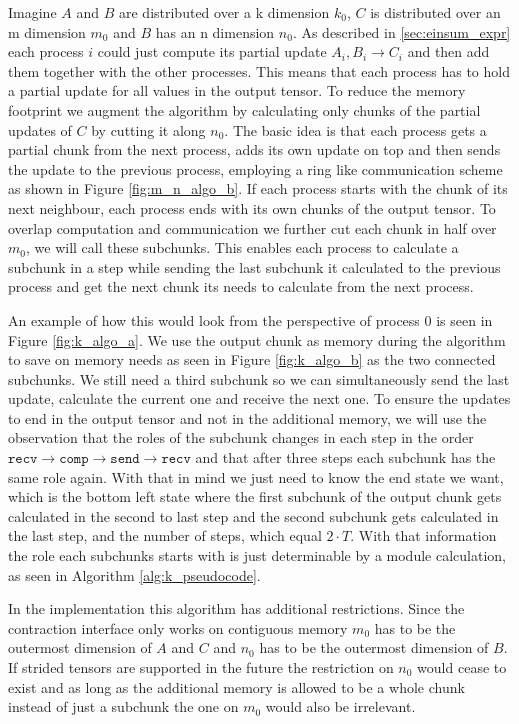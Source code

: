 Imagine $A$ and $B$ are distributed over a k dimension $k_0$, $C$ is distributed over an m dimension $m_0$ and $B$ has an n dimension $n_0$.
As described in \ref{sec:einsum_expr} each process $i$ could just compute its partial update $A_i, B_i \rightarrow C_i$ and then add them together with the other processes.
This means that each process has to hold a partial update for all values in the output tensor.
To reduce the memory footprint we augment the algorithm by calculating only chunks of the partial updates of $C$ by cutting it along $n_0$.
The basic idea is that each process gets a partial chunk from the next process, adds its own update on top and then sends the update to the previous process, employing a ring like communication scheme as shown in Figure \ref{fig:m_n_algo_b}.
If each process starts with the chunk of its next neighbour, each process ends with its own chunks of the output tensor.
To overlap computation and communication we further cut each chunk in half over $m_0$, we will call these subchunks.
This enables each process to calculate a subchunk in a step while sending the last subchunk it calculated to the previous process and get the next chunk its needs to calculate from the next process.

An example of how this would look from the perspective of process $0$ is seen in Figure \ref{fig:k_algo_a}.
We use the output chunk as memory during the algorithm to save on memory needs as seen in Figure \ref{fig:k_algo_b} as the two connected subchunks.
We still need a third subchunk so we can simultaneously send the last update, calculate the current one and receive the next one.
To ensure the updates to end in the output tensor and not in the additional memory, we will use the observation that the roles of the subchunk changes in each step in the order $\texttt{recv} \rightarrow \texttt{comp} \rightarrow \texttt{send} \rightarrow \texttt{recv}$ and that after three steps each subchunk has the same role again.
With that in mind we just need to know the end state we want, which is the bottom left state where the first subchunk of the output chunk gets calculated in the second to last step and the second subchunk gets calculated in the last step, and the number of steps, which equal $2 \cdot T$.
With that information the role each subchunks starts with is just determinable by a module calculation, as seen in Algorithm \ref{alg:k_pseudocode}.

In the implementation this algorithm has additional restrictions.
Since the contraction interface only works on contiguous memory $m_0$ has to be the outermost dimension of $A$ and $C$ and $n_0$ has to be the outermost dimension of $B$.
If strided tensors are supported in the future the restriction on $n_0$ would cease to exist and as long as the additional memory is allowed to be a whole chunk instead of just a subchunk the one on $m_0$ would also be irrelevant.

